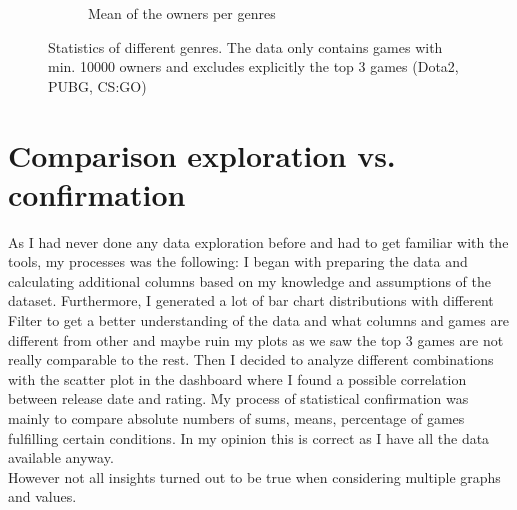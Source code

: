 \documentclass[11pt]{article}
\begin{document}
\begin{figure}[h]
\begin{subfigure}[b]{0.49\textwidth}
        \caption{Mean of the owners per genres}
        \label{fig:insight3_6}
    \end{subfigure}
    \caption{Statistics of different genres. The data only contains games with min. 10000 owners and excludes explicitly the top 3 games (Dota2, PUBG, CS:GO)}
    \label{fig:insight3_gen} 
  \end{figure}

\section{Comparison exploration vs. confirmation}

As I had never done any data exploration before and had to get familiar with the tools, my processes was the following: I began with preparing the data and calculating additional columns based on my knowledge and assumptions of the dataset. Furthermore, I generated a lot of bar chart distributions with different Filter to get a better understanding of the data and what columns and games are different from other and maybe ruin my plots as we saw the top 3 games are not really comparable to the rest.
Then I decided to analyze different combinations with the scatter plot in the dashboard where I found a possible correlation between release date and rating. My process of statistical confirmation was mainly to compare absolute numbers of sums, means, percentage of games fulfilling certain conditions. In my opinion this is correct as I have all the data available anyway.\\
However not all insights turned out to be true when considering multiple graphs and values. 
\end{document}

